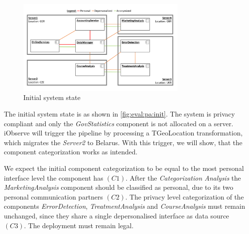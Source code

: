 
\begin{figure}[h]
	\centering
	\includegraphics[trim = 0mm 10mm 0mm 10mm, clip, width=0.75\textwidth]{graphs/medSys_eval_pa_init}
	\caption{Initial system state}
	\label{fig:eval:pa:init}
\end{figure}

The initial system state is as shown in \autoref{fig:eval:pa:init}. The system is privacy compliant and only the \textit{GovStatistics} component is not allocated on a server. iObserve will trigger the pipeline by processing a TGeoLocation transformation, which migrates the \textit{Server2} to Belarus. With this trigger, we will show, that the component categorization works as intended.

We expect the initial component categorization to be equal to the most personal interface level the component has $(C1)$. After the \textit{Categorization Analysis} the \textit{MarketingAnalysis} component should be classified as personal, due to its two personal communication partners $(C2)$. The privacy level categorization of the components \textit{ErrorDetection}, \textit{TreatmentAnalysis} and \textit{CourseAnalysis} must remain unchanged, since they share a single depersonalised interface as data source $(C3)$. The deployment must remain legal.

